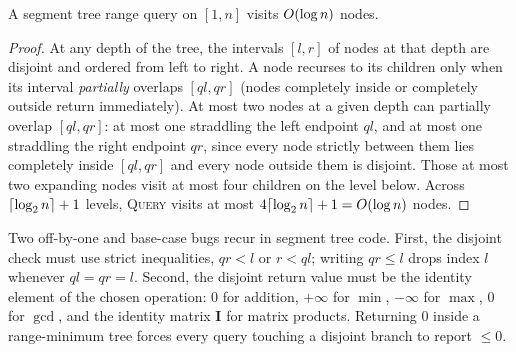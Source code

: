 \begin{algorithm}[H]
\caption{Segment tree: build, range query, and point update (sum; node $p$ owns $[l,r]$)}
\DontPrintSemicolon
{}
\end{algorithm}

\begin{theorem}
\label{ch42:thm-segtree}
A segment tree range query on $[1,n]$ visits $O(\log n)$ nodes.
\end{theorem}

\begin{proof}
At any depth of the tree, the intervals $[l,r]$ of nodes at that depth are disjoint and ordered from left to right. A node recurses to its children only when its interval \emph{partially} overlaps $[ql,qr]$ (nodes completely inside or completely outside return immediately). At most two nodes at a given depth can partially overlap $[ql,qr]$: at most one straddling the left endpoint $ql$, and at most one straddling the right endpoint $qr$, since every node strictly between them lies completely inside $[ql,qr]$ and every node outside them is disjoint. Those at most two expanding nodes visit at most four children on the level below. Across $\lceil\log_2 n\rceil + 1$ levels, \textsc{Query} visits at most $4\lceil\log_2 n\rceil + 1 = O(\log n)$ nodes.
\end{proof}

\begin{trapbox}
Two off-by-one and base-case bugs recur in segment tree code. First, the disjoint check must use strict inequalities, $qr < l$ or $r < ql$; writing $qr \le l$ drops index $l$ whenever $ql = qr = l$. Second, the disjoint return value must be the identity element of the chosen operation: $0$ for addition, $+\infty$ for $\min$, $-\infty$ for $\max$, $0$ for $\gcd$, and the identity matrix $\mathbf{I}$ for matrix products. Returning $0$ inside a range-minimum tree forces every query touching a disjoint branch to report $\le 0$.
\end{trapbox}

